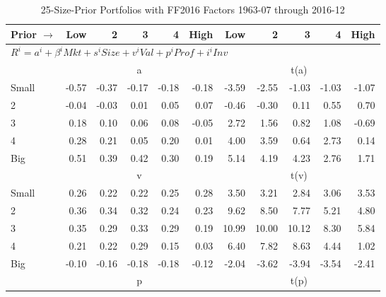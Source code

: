 
\begin{table}[!ht]
\centering
\caption{25-Size-Prior Portfolios with FF2016 Factors 1963-07 through 2016-12}
\begin{tabular}{lrrrrrrrrrr}
  \toprule
    Prior $\rightarrow$ & Low & 2 & 3 & 4 & High & Low & 2 & 3 & 4 & High \\ 
  \midrule
  \multicolumn{11}{l}{$R^i=a^i+\beta^iMkt+s^iSize+v^iVal+p^iProf+i^iInv$} \\

  
    
      & \multicolumn{5}{c}{a} & \multicolumn{5}{c}{t(a)}
    
    \\
      \cmidrule(r){2-6} \cmidrule(r){7-11}

    Small   & -0.57  & -0.37  & -0.17  & -0.18  & -0.18  & -3.59  & -2.55  & -1.03  & -1.03  & -1.07  \\
         2  & -0.04  & -0.03  & 0.01  & 0.05  & 0.07  & -0.46  & -0.30  & 0.11  & 0.55  & 0.70  \\
         3  & 0.18  & 0.10  & 0.06  & 0.08  & -0.05  & 2.72  & 1.56  & 0.82  & 1.08  & -0.69  \\
         4  & 0.28  & 0.21  & 0.05  & 0.20  & 0.01  & 4.00  & 3.59  & 0.64  & 2.73  & 0.14  \\
    Big     & 0.51  & 0.39  & 0.42  & 0.30  & 0.19  & 5.14  & 4.19  & 4.23  & 2.76  & 1.71  \\

  
    
      & \multicolumn{5}{c}{v} & \multicolumn{5}{c}{t(v)}
    
    \\
      \cmidrule(r){2-6} \cmidrule(r){7-11}

    Small   & 0.26  & 0.22  & 0.22  & 0.25  & 0.28  & 3.50  & 3.21  & 2.84  & 3.06  & 3.53  \\
         2  & 0.36  & 0.34  & 0.32  & 0.24  & 0.23  & 9.62  & 8.50  & 7.77  & 5.21  & 4.80  \\
         3  & 0.35  & 0.29  & 0.33  & 0.29  & 0.19  & 10.99  & 10.00  & 10.12  & 8.30  & 5.84  \\
         4  & 0.21  & 0.22  & 0.29  & 0.15  & 0.03  & 6.40  & 7.82  & 8.63  & 4.44  & 1.02  \\
    Big     & -0.10  & -0.16  & -0.18  & -0.18  & -0.12  & -2.04  & -3.62  & -3.94  & -3.54  & -2.41  \\

  
    
      & \multicolumn{5}{c}{p} & \multicolumn{5}{c}{t(p)}
    

\end{tabular}
\end{table}
